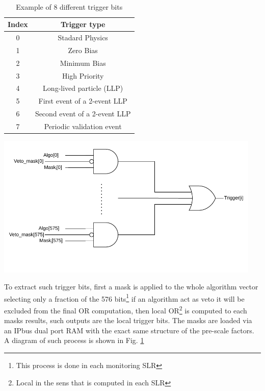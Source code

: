 \documentclass[a4paper,11pt]{article}
\begin{document}
\begin{table}[ht] \
  \begin{minipage}[b]{0.5\linewidth}
    \centering
    \begin{tabular}{|c|c|}
    \hline
    Index & Trigger type      \\
    \hline
    0 & Stadard Physics     \\
    1 & Zero Bias           \\
    2 & Minimum Bias            \\
    3 & High Priority       \\
    4 & Long-lived particle (LLP)    \\
    5 & First event of a 2-event LLP   \\
    6 & Second event of a 2-event LLP  \\
    7 & Periodic validation event      \\
    \hline
    \end{tabular}
    \caption{Example of 8 different trigger bits}
    \label{tab:trigger_types}
    \vspace{4ex}
  \end{minipage}%
  \begin{minipage}[b]{0.5\linewidth}
    \centering
    \includegraphics[width=0.95\textwidth]{Images/Modules/Trigger_mask.pdf}
    \label{fig:TriggMasks}
    \vspace{4ex}
  \end{minipage} 
\end{table}

To extract such trigger bits, first a mask is applied to the whole algorithm vector selecting only a fraction of the 576 bits\footnote{This process is done in each monitoring SLR} if an algorithm act as veto it will be excluded from the final OR computation, then local OR\footnote{Local in the sens that is computed in each SLR} is computed to each masks results, such outputs are the local trigger bits. The masks are loaded via an IPbus dual port RAM with the exact same structure of the pre-scale factors. A diagram of such process is shown in Fig. \ref{fig:TriggMasks}
\end{document}
